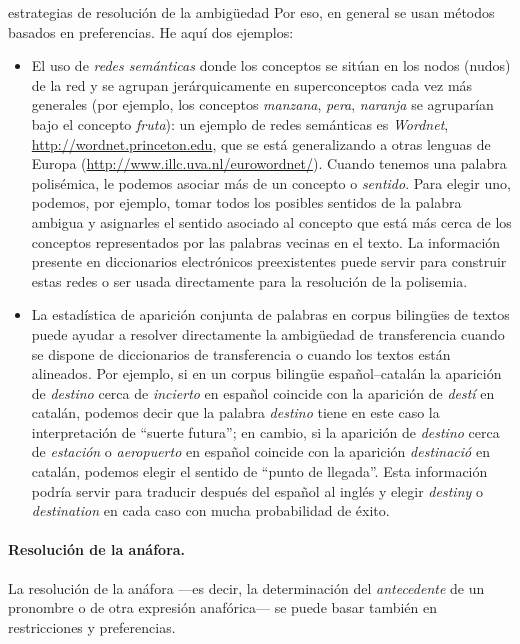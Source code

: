 \begin{persabermes}{estrategias de resolución de la ambigüedad}
Por eso, en general se usan métodos basados en preferencias. He aquí dos ejemplos: \begin{itemize} \item El uso de \emph{redes semánticas} donde los conceptos se sitúan en los nodos (nudos) de la red y se agrupan jerárquicamente en superconceptos cada vez más generales (por ejemplo, los conceptos \emph{manzana}, \emph{pera}, \emph{naranja} se agruparían bajo el concepto \emph{fruta}): un ejemplo de redes semánticas es \emph{Wordnet}, \url{http://wordnet.princeton.edu}, que se está generalizando a otras lenguas de Europa (\url{http://www.illc.uva.nl/eurowordnet/}). Cuando tenemos una palabra polisémica, le podemos asociar más de un concepto o \emph{sentido}. Para elegir uno, podemos, por ejemplo, tomar todos los posibles sentidos de la palabra ambigua y asignarles el sentido asociado al concepto que está más cerca de los conceptos representados por las palabras vecinas en el texto. La información presente en diccionarios electrónicos preexistentes puede servir para construir estas redes o ser usada directamente para la resolución de la polisemia. \item La estadística de aparición conjunta de palabras en corpus bilingües de textos puede ayudar a resolver directamente la ambigüedad de transferencia cuando se dispone de diccionarios de transferencia o cuando los textos están alineados. Por ejemplo, si en un corpus bilingüe español--catalán la aparición de \emph{destino} cerca de \emph{incierto} en español coincide con la aparición de \emph{destí} en catalán, podemos decir que la palabra \emph{destino} tiene en este caso la interpretación de ``suerte futura''; en cambio, si la aparición de {\em destino} cerca de \emph{estación} o \emph{aeropuerto} en español coincide con la aparición \emph{destinació} en catalán, podemos elegir el sentido de ``punto de llegada''. Esta información podría servir para traducir después del español al inglés y elegir {\em destiny} o \emph{destination} en cada caso con mucha probabilidad de éxito. 

\end{itemize} 

\paragraph{Resolución de la anáfora.} La resolución de la anáfora ---es decir, la determinación del {\em antecedente} de un pronombre o de otra expresión anafórica--- se puede basar también en restricciones y preferencias. 


\end{persabermes}
